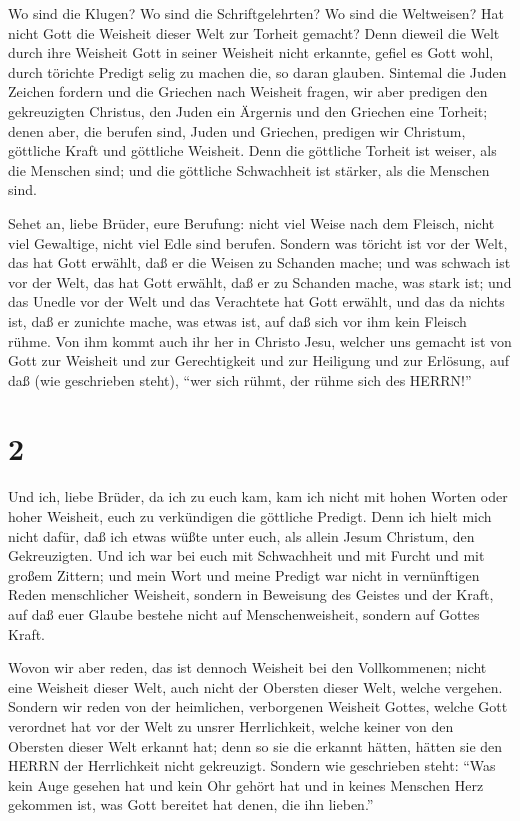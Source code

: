  Wo sind die Klugen? Wo sind die Schriftgelehrten? Wo sind
die Weltweisen? Hat nicht Gott die Weisheit dieser Welt zur Torheit
gemacht?  Denn dieweil die Welt durch ihre Weisheit Gott in
seiner Weisheit nicht erkannte, gefiel es Gott wohl, durch törichte
Predigt selig zu machen die, so daran glauben.  Sintemal
die Juden Zeichen fordern und die Griechen nach Weisheit fragen,
 wir aber predigen den gekreuzigten Christus, den Juden ein
Ärgernis und den Griechen eine Torheit;  denen aber, die
berufen sind, Juden und Griechen, predigen wir Christum, göttliche Kraft
und göttliche Weisheit.  Denn die göttliche Torheit ist
weiser, als die Menschen sind; und die göttliche Schwachheit ist
stärker, als die Menschen sind.

 Sehet an, liebe Brüder, eure Berufung: nicht viel Weise
nach dem Fleisch, nicht viel Gewaltige, nicht viel Edle sind berufen.
 Sondern was töricht ist vor der Welt, das hat Gott
erwählt, daß er die Weisen zu Schanden mache; und was schwach ist vor
der Welt, das hat Gott erwählt, daß er zu Schanden mache, was stark ist;
 und das Unedle vor der Welt und das Verachtete hat Gott
erwählt, und das da nichts ist, daß er zunichte mache, was etwas ist,
 auf daß sich vor ihm kein Fleisch rühme.  Von
ihm kommt auch ihr her in Christo Jesu, welcher uns gemacht ist von Gott
zur Weisheit und zur Gerechtigkeit und zur Heiligung und zur Erlösung,
 auf daß (wie geschrieben steht), ``wer sich rühmt, der
rühme sich des HERRN!''

\hypertarget{section-1}{%
\section{2}\label{section-1}}

 Und ich, liebe Brüder, da ich zu euch kam, kam ich nicht
mit hohen Worten oder hoher Weisheit, euch zu verkündigen die göttliche
Predigt.  Denn ich hielt mich nicht dafür, daß ich etwas
wüßte unter euch, als allein Jesum Christum, den Gekreuzigten.
 Und ich war bei euch mit Schwachheit und mit Furcht und mit
großem Zittern;  und mein Wort und meine Predigt war nicht
in vernünftigen Reden menschlicher Weisheit, sondern in Beweisung des
Geistes und der Kraft,  auf daß euer Glaube bestehe nicht
auf Menschenweisheit, sondern auf Gottes Kraft.

 Wovon wir aber reden, das ist dennoch Weisheit bei den
Vollkommenen; nicht eine Weisheit dieser Welt, auch nicht der Obersten
dieser Welt, welche vergehen.  Sondern wir reden von der
heimlichen, verborgenen Weisheit Gottes, welche Gott verordnet hat vor
der Welt zu unsrer Herrlichkeit,  welche keiner von den
Obersten dieser Welt erkannt hat; denn so sie die erkannt hätten, hätten
sie den HERRN der Herrlichkeit nicht gekreuzigt.  Sondern
wie geschrieben steht: ``Was kein Auge gesehen hat und kein Ohr gehört
hat und in keines Menschen Herz gekommen ist, was Gott bereitet hat
denen, die ihn lieben.''

